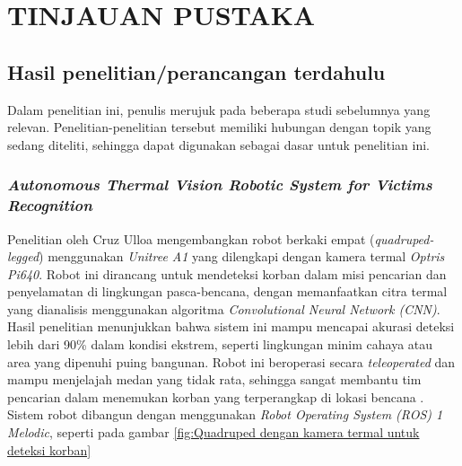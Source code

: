 \chapter{TINJAUAN PUSTAKA}
\label{chap:tinjauanpustaka}



\section{Hasil penelitian/perancangan terdahulu}
Dalam penelitian ini, penulis merujuk pada beberapa studi sebelumnya yang relevan. Penelitian-penelitian tersebut memiliki hubungan dengan topik yang sedang diteliti, sehingga dapat digunakan sebagai dasar untuk penelitian ini.

\subsection{\emph{Autonomous Thermal Vision Robotic System for Victims Recognition}}

Penelitian oleh Cruz Ulloa mengembangkan robot berkaki empat (\emph{quadruped-legged}) menggunakan \emph{Unitree A1} yang dilengkapi dengan kamera termal \emph{Optris Pi640}. Robot ini dirancang untuk mendeteksi korban dalam misi pencarian dan penyelamatan di lingkungan pasca-bencana, dengan memanfaatkan citra termal yang dianalisis menggunakan algoritma \emph{Convolutional Neural Network (CNN)}. Hasil penelitian menunjukkan bahwa sistem ini mampu mencapai akurasi deteksi lebih dari 90\% dalam kondisi ekstrem, seperti lingkungan minim cahaya atau area yang dipenuhi puing bangunan. Robot ini beroperasi secara \emph{teleoperated} dan mampu menjelajah medan yang tidak rata, sehingga sangat membantu tim pencarian dalam menemukan korban yang terperangkap di lokasi bencana \cite{Cruz2021}. Sistem robot dibangun dengan menggunakan \emph{Robot Operating System (ROS) 1 Melodic}, seperti pada gambar \ref{fig:Quadruped dengan kamera termal untuk deteksi korban}

